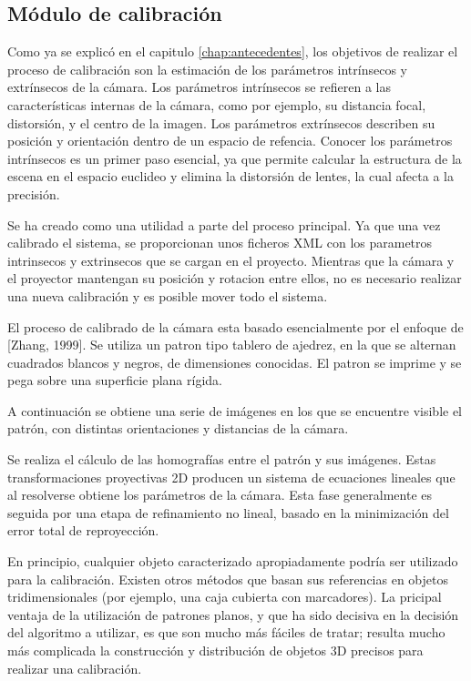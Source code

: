 \subsection{Módulo de calibración}
Como ya se explicó en el capitulo \ref{chap:antecedentes}, los objetivos de realizar el proceso de calibración son la estimación de los parámetros intrínsecos y extrínsecos de la cámara. Los parámetros intrínsecos se refieren a las características internas de la cámara, como por ejemplo, su distancia focal, distorsión, y el centro de la imagen. Los parámetros extrínsecos describen su posición y orientación dentro de un espacio de refencia. Conocer los parámetros intrínsecos es un primer paso esencial, ya que permite calcular la estructura de la escena en el espacio euclideo y elimina la distorsión de lentes, la cual afecta a la precisión.

Se ha creado como una utilidad a parte del proceso principal. Ya que una vez calibrado el sistema, se proporcionan unos ficheros XML con los parametros intrinsecos y extrinsecos que se cargan en el proyecto. Mientras que la cámara y el proyector mantengan su posición y rotacion entre ellos, no es necesario realizar una nueva calibración y es posible mover todo el sistema.

El proceso de calibrado de la cámara esta basado esencialmente por el enfoque de [Zhang, 1999]. Se utiliza un patron tipo tablero de ajedrez, en la que se alternan cuadrados blancos y negros, de dimensiones conocidas. El patron se imprime y se pega sobre una superficie plana rígida.

A continuación se obtiene una serie de imágenes en los que se encuentre visible el patrón, con distintas orientaciones y distancias de la cámara. 

Se realiza el cálculo de las homografías entre el patrón y sus imágenes. Estas transformaciones proyectivas 2D producen un sistema de ecuaciones lineales que al resolverse obtiene los parámetros de la cámara. Esta fase generalmente es seguida por una etapa de refinamiento no lineal, basado en la minimización del error total de reproyección.

En principio, cualquier objeto caracterizado apropiadamente podría ser utilizado para la calibración. Existen otros métodos que basan sus referencias en objetos tridimensionales (por ejemplo, una caja cubierta con marcadores).  
La pricipal ventaja de la utilización de patrones planos, y que ha sido decisiva en la decisión del algoritmo a utilizar, es que son mucho más fáciles de tratar; resulta mucho más complicada la construcción y distribución de objetos 3D precisos para realizar una calibración.


